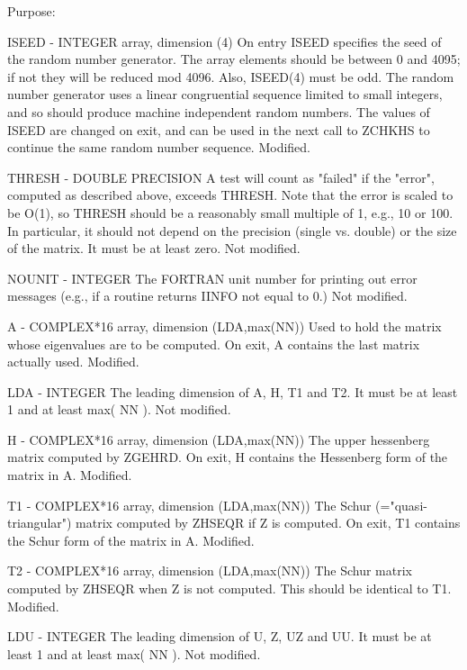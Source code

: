 \begin{DoxyParagraph}{Purpose\+: }
\begin{DoxyVerb}
  ISEED  - INTEGER array, dimension (4)
           On entry ISEED specifies the seed of the random number
           generator. The array elements should be between 0 and 4095;
           if not they will be reduced mod 4096.  Also, ISEED(4) must
           be odd.  The random number generator uses a linear
           congruential sequence limited to small integers, and so
           should produce machine independent random numbers. The
           values of ISEED are changed on exit, and can be used in the
           next call to ZCHKHS to continue the same random number
           sequence.
           Modified.

  THRESH - DOUBLE PRECISION
           A test will count as "failed" if the "error", computed as
           described above, exceeds THRESH.  Note that the error
           is scaled to be O(1), so THRESH should be a reasonably
           small multiple of 1, e.g., 10 or 100.  In particular,
           it should not depend on the precision (single vs. double)
           or the size of the matrix.  It must be at least zero.
           Not modified.

  NOUNIT - INTEGER
           The FORTRAN unit number for printing out error messages
           (e.g., if a routine returns IINFO not equal to 0.)
           Not modified.

  A      - COMPLEX*16 array, dimension (LDA,max(NN))
           Used to hold the matrix whose eigenvalues are to be
           computed.  On exit, A contains the last matrix actually
           used.
           Modified.

  LDA    - INTEGER
           The leading dimension of A, H, T1 and T2.  It must be at
           least 1 and at least max( NN ).
           Not modified.

  H      - COMPLEX*16 array, dimension (LDA,max(NN))
           The upper hessenberg matrix computed by ZGEHRD.  On exit,
           H contains the Hessenberg form of the matrix in A.
           Modified.

  T1     - COMPLEX*16 array, dimension (LDA,max(NN))
           The Schur (="quasi-triangular") matrix computed by ZHSEQR
           if Z is computed.  On exit, T1 contains the Schur form of
           the matrix in A.
           Modified.

  T2     - COMPLEX*16 array, dimension (LDA,max(NN))
           The Schur matrix computed by ZHSEQR when Z is not computed.
           This should be identical to T1.
           Modified.

  LDU    - INTEGER
           The leading dimension of U, Z, UZ and UU.  It must be at
           least 1 and at least max( NN ).
           Not modified.


\end{DoxyVerb}
\end{DoxyParagraph}
